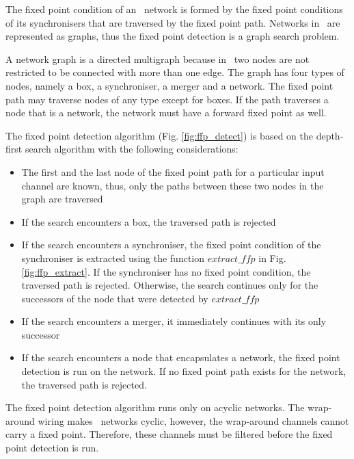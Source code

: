 The fixed point condition of an \ak\ network is formed by the fixed point conditions of its synchronisers that are traversed by the fixed point path. Networks in \ak\ are represented as graphs, thus the fixed point detection is a graph search problem.

A network graph is a directed multigraph because in \ak\ two nodes are not restricted to be connected with more than one edge. The graph has four types of nodes, namely a box, a synchroniser, a merger and a network. The fixed point path may traverse nodes of any type except for boxes. If the path traverses a node that is a network, the network must have a forward fixed point as well.

The fixed point detection algorithm (Fig. \ref{fig:ffp_detect}) is based on the depth-first search algorithm with the following considerations:
\begin{itemize}
\item The first and the last node of the fixed point path for a particular input channel are known, thus, only the paths between these two nodes in the graph are traversed

\item If the search encounters a box, the traversed path is rejected

\item If the search encounters a synchroniser, the fixed point condition of the synchroniser is extracted using the function $extract\_ffp$ in Fig. \ref{fig:ffp_extract}. If the synchroniser has no fixed point condition, the traversed path is rejected. Otherwise, the search continues only for the successors of the node that were detected by $extract\_ffp$

\item If the search encounters a merger, it immediately continues with its only successor

\item If the search encounters a node that encapsulates a network, the fixed point detection is run on the network. If no fixed point path exists for the network, the traversed path is rejected.
\end{itemize}

The fixed point detection algorithm runs only on acyclic networks. The wrap-around wiring makes \ak\ networks cyclic, however, the wrap-around channels cannot carry a fixed point. Therefore, these channels must be filtered before the fixed point detection is run.


